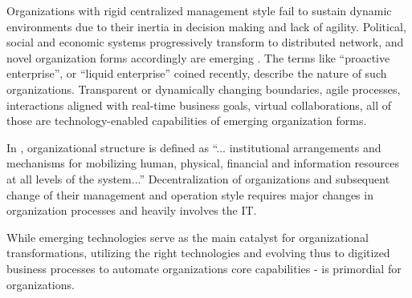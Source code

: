 Organizations with rigid centralized management style fail to sustain dynamic environments due to their inertia in decision making and lack of agility. Political, social and economic systems progressively transform to distributed network, and novel organization forms accordingly are emerging \cite{bowens}. The terms like ``proactive enterprise'', or ``liquid enterprise'' coined recently, describe  the nature of such organizations. Transparent or dynamically changing boundaries, agile processes, interactions aligned with real-time business goals, virtual collaborations, all of those are technology-enabled capabilities of emerging organization forms.

In \cite{sachdeva1990}, organizational structure is defined as ``... institutional arrangements and mechanisms for mobilizing human, physical, financial and information resources at all levels of the system...'' Decentralization of organizations and subsequent change
of their management and operation style requires major changes in organization processes and heavily involves the IT.



 While emerging technologies serve as the main catalyst for organizational transformations, utilizing the right technologies and evolving thus to digitized business processes to automate organizations core capabilities \cite{ross2006} - is primordial for organizations. 

